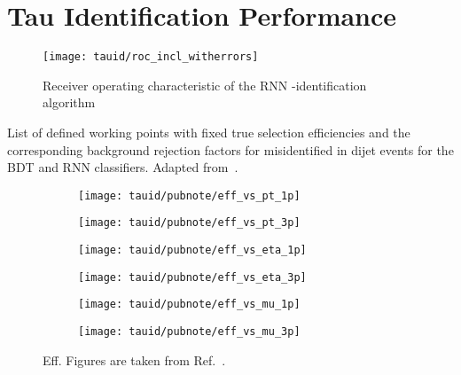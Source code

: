 \section{Tau Identification Performance}
\label{sec:tauid_perf}

\begin{figure}[htbp]
  \centering

  \texttt{[image: tauid/roc\_incl\_witherrors]}

  \caption{Receiver operating characteristic of the RNN
    \tauhad-identification algorithm \cite{ATL-PHYS-PUB-2019-033}}%
  \label{fig:tauid_rnn_bdt_roc_comparison}
\end{figure}


\begin{table}
  \centering

  \caption{List of defined working points with fixed true \tauhadvis
    selection efficiencies and the corresponding background rejection
    factors for misidentified \tauhadvis in dijet events for the BDT
    and RNN classifiers. Adapted from~\cite{ATL-PHYS-PUB-2019-033}.}%
  \label{tab:rnn_wps}

  
\end{table}


\begin{figure}[htbp]

  \begin{subfigure}{0.498\textwidth}
    \texttt{[image: tauid/pubnote/eff\_vs\_pt\_1p]}
    \subcaption{}
  \end{subfigure}\hfill%
  \begin{subfigure}{0.498\textwidth}
    \texttt{[image: tauid/pubnote/eff\_vs\_pt\_3p]}
    \subcaption{}
  \end{subfigure}

  \begin{subfigure}{0.498\textwidth}
    \texttt{[image: tauid/pubnote/eff\_vs\_eta\_1p]}
    \subcaption{}
  \end{subfigure}\hfill%
  \begin{subfigure}{0.498\textwidth}
    \texttt{[image: tauid/pubnote/eff\_vs\_eta\_3p]}
    \subcaption{}
  \end{subfigure}

  \begin{subfigure}{0.498\textwidth}
    \texttt{[image: tauid/pubnote/eff\_vs\_mu\_1p]}
    \subcaption{}
  \end{subfigure}\hfill%
  \begin{subfigure}{0.498\textwidth}
    \texttt{[image: tauid/pubnote/eff\_vs\_mu\_3p]}
    \subcaption{}
  \end{subfigure}

  \caption{Eff. Figures are taken from
    Ref.~\cite{ATL-PHYS-PUB-2019-033}.}
  \label{fig:tauid_truetau_eff}
\end{figure}





